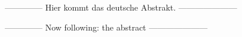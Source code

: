 -------------- Hier kommt das deutsche Abstrakt. ---------------------


-------------- Now following: the abstract  ---------------------